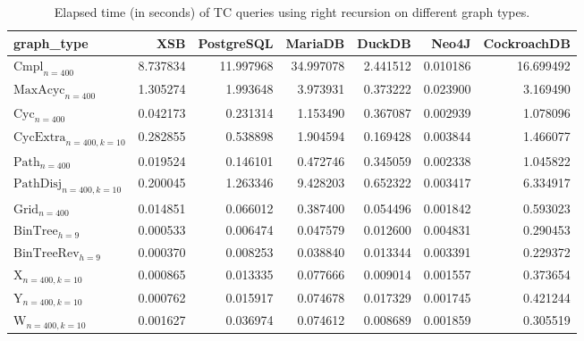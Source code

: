 \begin{table}
\caption{Elapsed time (in seconds) of TC queries using right recursion on different graph types.}
\label{table:right_recursion_real_time}
\begin{tabular}{lrrrrrr}
\toprule
graph\_type & XSB & PostgreSQL & MariaDB & DuckDB & Neo4J & CockroachDB \\
\midrule
$\text{Cmpl}_{n=400}$ & 8.737834 & 11.997968 & 34.997078 & 2.441512 & 0.010186 & 16.699492 \\
$\text{MaxAcyc}_{n=400}$ & 1.305274 & 1.993648 & 3.973931 & 0.373222 & 0.023900 & 3.169490 \\
$\text{Cyc}_{n=400}$ & 0.042173 & 0.231314 & 1.153490 & 0.367087 & 0.002939 & 1.078096 \\
$\text{CycExtra}_{n=400,k=10}$ & 0.282855 & 0.538898 & 1.904594 & 0.169428 & 0.003844 & 1.466077 \\
$\text{Path}_{n=400}$ & 0.019524 & 0.146101 & 0.472746 & 0.345059 & 0.002338 & 1.045822 \\
$\text{PathDisj}_{n=400,k=10}$ & 0.200045 & 1.263346 & 9.428203 & 0.652322 & 0.003417 & 6.334917 \\
$\text{Grid}_{n=400}$ & 0.014851 & 0.066012 & 0.387400 & 0.054496 & 0.001842 & 0.593023 \\
$\text{BinTree}_{h=9}$ & 0.000533 & 0.006474 & 0.047579 & 0.012600 & 0.004831 & 0.290453 \\
$\text{BinTreeRev}_{h=9}$ & 0.000370 & 0.008253 & 0.038840 & 0.013344 & 0.003391 & 0.229372 \\
$\text{X}_{n=400, k=10}$ & 0.000865 & 0.013335 & 0.077666 & 0.009014 & 0.001557 & 0.373654 \\
$\text{Y}_{n=400,k=10}$ & 0.000762 & 0.015917 & 0.074678 & 0.017329 & 0.001745 & 0.421244 \\
$\text{W}_{n=400,k=10}$ & 0.001627 & 0.036974 & 0.074612 & 0.008689 & 0.001859 & 0.305519 \\
\bottomrule
\end{tabular}
\end{table}
